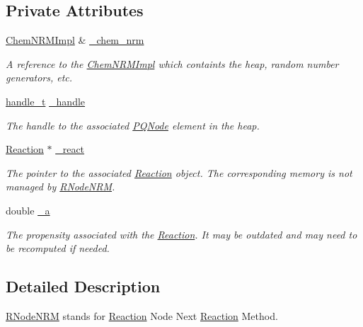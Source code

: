 \subsection*{Private Attributes}
\begin{DoxyCompactItemize}
\item 
\hyperlink{classchem_1_1ChemNRMImpl}{Chem\-N\-R\-M\-Impl} \& \hyperlink{classchem_1_1RNodeNRM_acff43a1b27a778b6534bd8010904f821}{\-\_\-chem\-\_\-nrm}
\begin{DoxyCompactList}\small\item\em A reference to the \hyperlink{classchem_1_1ChemNRMImpl}{Chem\-N\-R\-M\-Impl} which containts the heap, random number generators, etc. \end{DoxyCompactList}\item 
\hyperlink{namespacechem_a33be80d87771bff54f5cede2e5d81cd1}{handle\-\_\-t} \hyperlink{classchem_1_1RNodeNRM_ad124c85b0f1b479cf0c1f4bf75230c19}{\-\_\-handle}
\begin{DoxyCompactList}\small\item\em The handle to the associated \hyperlink{classchem_1_1PQNode}{P\-Q\-Node} element in the heap. \end{DoxyCompactList}\item 
\hyperlink{classchem_1_1Reaction}{Reaction} $\ast$ \hyperlink{classchem_1_1RNodeNRM_a2430f6bd22239fc5b629bca05f9d34a8}{\-\_\-react}
\begin{DoxyCompactList}\small\item\em The pointer to the associated \hyperlink{classchem_1_1Reaction}{Reaction} object. The corresponding memory is not managed by \hyperlink{classchem_1_1RNodeNRM}{R\-Node\-N\-R\-M}. \end{DoxyCompactList}\item 
double \hyperlink{classchem_1_1RNodeNRM_ae16aa8e75649d855f4b6eae8b00ed1db}{\-\_\-a}
\begin{DoxyCompactList}\small\item\em The propensity associated with the \hyperlink{classchem_1_1Reaction}{Reaction}. It may be outdated and may need to be recomputed if needed. \end{DoxyCompactList}\end{DoxyCompactItemize}


\subsection{Detailed Description}
\hyperlink{classchem_1_1RNodeNRM}{R\-Node\-N\-R\-M} stands for \hyperlink{classchem_1_1Reaction}{Reaction} Node Next \hyperlink{classchem_1_1Reaction}{Reaction} Method. 


